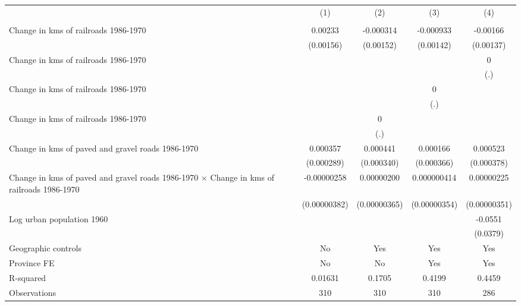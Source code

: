 {
\def\sym#1{\ifmmode^{#1}\else\(^{#1}\)\fi}
\begin{tabular}{l*{4}{c}}
\hline\hline
                &\multicolumn{1}{c}{(1)}&\multicolumn{1}{c}{(2)}&\multicolumn{1}{c}{(3)}&\multicolumn{1}{c}{(4)}\\
                &\multicolumn{1}{c}{}&\multicolumn{1}{c}{}&\multicolumn{1}{c}{}&\multicolumn{1}{c}{}\\
\hline
Change in kms of railroads 1986-1970&  0.00233         &-0.000314         &-0.000933         & -0.00166         \\
                &(0.00156)         &(0.00152)         &(0.00142)         &(0.00137)         \\
[1em]
Change in kms of railroads 1986-1970&                  &                  &                  &        0         \\
                &                  &                  &                  &      (.)         \\
[1em]
Change in kms of railroads 1986-1970&                  &                  &        0         &                  \\
                &                  &                  &      (.)         &                  \\
[1em]
Change in kms of railroads 1986-1970&                  &        0         &                  &                  \\
                &                  &      (.)         &                  &                  \\
[1em]
Change in kms of paved and gravel roads 1986-1970& 0.000357         & 0.000441         & 0.000166         & 0.000523         \\
                &(0.000289)         &(0.000340)         &(0.000366)         &(0.000378)         \\
[1em]
Change in kms of paved and gravel roads 1986-1970 $\times$ Change in kms of railroads 1986-1970&-0.00000258         &0.00000200         &0.000000414         &0.00000225         \\
                &(0.00000382)         &(0.00000365)         &(0.00000354)         &(0.00000351)         \\
[1em]
Log urban population 1960&                  &                  &                  &  -0.0551         \\
                &                  &                  &                  & (0.0379)         \\
\hline
Geographic controls&       No         &      Yes         &      Yes         &      Yes         \\
Province FE     &       No         &       No         &      Yes         &      Yes         \\
R-squared       &  0.01631         &   0.1705         &   0.4199         &   0.4459         \\
Observations    &      310         &      310         &      310         &      286         \\
\hline\hline
\end{tabular}
}
